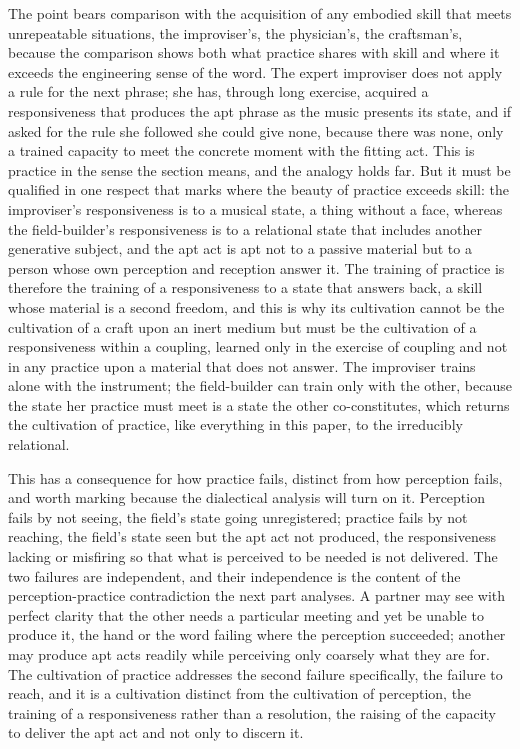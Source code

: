 The point bears comparison with the acquisition of any embodied skill that meets unrepeatable situations, the improviser's, the physician's, the craftsman's, because the comparison shows both what practice shares with skill and where it exceeds the engineering sense of the word. The expert improviser does not apply a rule for the next phrase; she has, through long exercise, acquired a responsiveness that produces the apt phrase as the music presents its state, and if asked for the rule she followed she could give none, because there was none, only a trained capacity to meet the concrete moment with the fitting act. This is practice in the sense the section means, and the analogy holds far. But it must be qualified in one respect that marks where the beauty of practice exceeds skill: the improviser's responsiveness is to a musical state, a thing without a face, whereas the field-builder's responsiveness is to a relational state that includes another generative subject, and the apt act is apt not to a passive material but to a person whose own perception and reception answer it. The training of practice is therefore the training of a responsiveness to a state that answers back, a skill whose material is a second freedom, and this is why its cultivation cannot be the cultivation of a craft upon an inert medium but must be the cultivation of a responsiveness within a coupling, learned only in the exercise of coupling and not in any practice upon a material that does not answer. The improviser trains alone with the instrument; the field-builder can train only with the other, because the state her practice must meet is a state the other co-constitutes, which returns the cultivation of practice, like everything in this paper, to the irreducibly relational.

This has a consequence for how practice fails, distinct from how perception fails, and worth marking because the dialectical analysis will turn on it. Perception fails by not seeing, the field's state going unregistered; practice fails by not reaching, the field's state seen but the apt act not produced, the responsiveness lacking or misfiring so that what is perceived to be needed is not delivered. The two failures are independent, and their independence is the content of the perception-practice contradiction the next part analyses. A partner may see with perfect clarity that the other needs a particular meeting and yet be unable to produce it, the hand or the word failing where the perception succeeded; another may produce apt acts readily while perceiving only coarsely what they are for. The cultivation of practice addresses the second failure specifically, the failure to reach, and it is a cultivation distinct from the cultivation of perception, the training of a responsiveness rather than a resolution, the raising of the capacity to deliver the apt act and not only to discern it.

